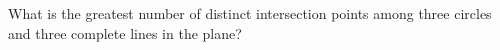 What is the greatest number of distinct intersection points among three circles and three complete lines in the plane?

